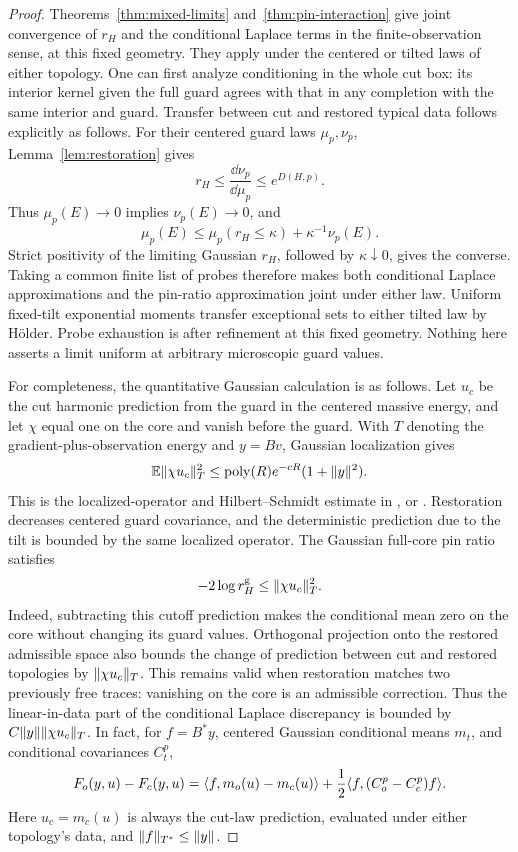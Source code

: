 \begin{proof}
Theorems~\ref{thm:mixed-limits} and~\ref{thm:pin-interaction}
give joint convergence of \(r_H\) and the conditional Laplace
terms in the finite-observation sense, at this fixed geometry.
They apply under the centered or tilted laws of either
topology. One can first analyze conditioning in the whole cut
box: its interior kernel given the full guard agrees with that
in any completion with the same interior and guard. Transfer
between cut and restored typical data follows explicitly as
follows. For their centered guard laws \(\mu_p,\nu_p\),
Lemma~\ref{lem:restoration} gives
\[
 r_H\le \frac{\dd\nu_p}{\dd\mu_p}\le e^{D(H,p)}.
\]
Thus \(\mu_p(E)\to0\) implies \(\nu_p(E)\to0\), and
\[
 \mu_p(E)\le \mu_p(r_H\le\kappa)+\kappa^{-1}\nu_p(E).
\]
Strict positivity of the limiting Gaussian \(r_H\), followed
by \(\kappa\downarrow0\), gives the converse. Taking a common
finite list of probes therefore makes both conditional
Laplace approximations and the pin-ratio approximation joint
under either law. Uniform fixed-tilt exponential moments
transfer exceptional sets to either tilted law by H\"older.
Probe exhaustion is after refinement at this fixed geometry.
Nothing here asserts a limit uniform at arbitrary microscopic
guard values.

For completeness, the quantitative Gaussian calculation is as
follows. Let \(u_c\) be the cut harmonic prediction from the guard
in the centered massive energy, and let \(\chi\) equal one on
the core and vanish before the guard. With \(T\) denoting the
gradient-plus-observation energy and \(y=Bv\), Gaussian
localization gives
\begin{equation}\label{eq:magnetic-prediction}
 \mathbb E\lVert \chi u_c\rVert_T^2
       \le {\rm poly}(R)e^{-cR}(1+\lVert y\rVert^2).
\end{equation}
This is the localized-operator and Hilbert--Schmidt estimate in
, or .
Restoration decreases centered guard covariance, and the
deterministic prediction due to the tilt is bounded by the
same localized operator. The Gaussian full-core pin ratio
satisfies
\[
                  -2\log r_H^{\mathrm g}
                         \le \lVert \chi u_c\rVert_T^2.
\]
Indeed, subtracting this cutoff prediction makes the
conditional mean zero on the core without changing its guard
values. Orthogonal projection onto the restored admissible
space also bounds the change of prediction between cut and
restored topologies by \(\lVert \chi u_c\rVert_T\). This remains
valid when restoration matches two previously free traces:
vanishing on the core is an admissible correction.
Thus the linear-in-data part of the conditional Laplace
discrepancy is bounded by \(C\lVert y\rVert\lVert \chi u_c\rVert_T\).
In fact, for \(f=B^*y\), centered Gaussian conditional means
\(m_t\), and conditional covariances \(C_t^p\),
\[
 F_o(y,u)-F_c(y,u)
  =\langle f,m_o(u)-m_c(u)\rangle
       +\frac12\langle f,(C_o^p-C_c^p)f\rangle.
\]
Here \(u_c=m_c(u)\) is always the cut-law prediction,
evaluated under either topology's data, and
\(\lVert f\rVert_{T^*}\le\lVert y\rVert\).


\end{proof}

